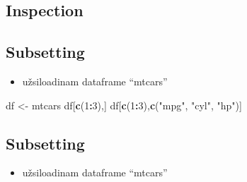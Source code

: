 \documentclass[]{article}
\newenvironment{Shaded}{\begin{snugshade}}{\end{snugshade}}
\newcommand{\KeywordTok}[1]{\textcolor[rgb]{0.13,0.29,0.53}{\textbf{#1}}}
\newcommand{\DecValTok}[1]{\textcolor[rgb]{0.00,0.00,0.81}{#1}}
\newcommand{\StringTok}[1]{\textcolor[rgb]{0.31,0.60,0.02}{#1}}
\newcommand{\OperatorTok}[1]{\textcolor[rgb]{0.81,0.36,0.00}{\textbf{#1}}}
\newcommand{\NormalTok}[1]{#1}
\providecommand{\tightlist}{%
  \setlength{\itemsep}{0pt}\setlength{\parskip}{0pt}}
\begin{document}
\subsection{Inspection}\label{inspection-4}

\begin{Shaded}
\end{Shaded}

\subsection{Subsetting}\label{subsetting}

\begin{itemize}
\tightlist
\item
  užsiloadinam dataframe ``mtcars''
\end{itemize}

\begin{Shaded}
\begin{Highlighting}[]
\NormalTok{df <-}\StringTok{ }\NormalTok{mtcars}
\NormalTok{df[}\KeywordTok{c}\NormalTok{(}\DecValTok{1}\OperatorTok{:}\DecValTok{3}\NormalTok{),]}
\NormalTok{df[}\KeywordTok{c}\NormalTok{(}\DecValTok{1}\OperatorTok{:}\DecValTok{3}\NormalTok{),}\KeywordTok{c}\NormalTok{(}\StringTok{"mpg"}\NormalTok{, }\StringTok{"cyl"}\NormalTok{, }\StringTok{"hp"}\NormalTok{)]}
\end{Highlighting}
\end{Shaded}

\subsection{Subsetting}\label{subsetting-1}

\begin{itemize}
\tightlist
\item
  užsiloadinam dataframe ``mtcars''
\end{itemize}
\end{document}
